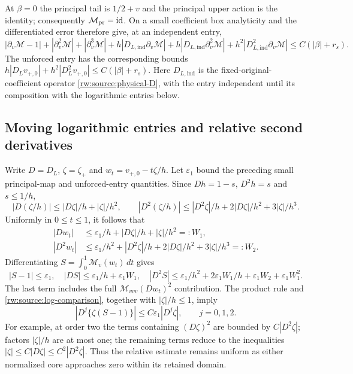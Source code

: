At $\beta=0$ the principal tail is $1/2+v$ and the principal upper
action is the identity; consequently $\mathcal M_{\rm pr}=\mathrm{id}$.
On a small coefficient box analyticity and the differentiated error
therefore give, at an independent entry,
\[
 |\partial_v\mathcal M-1|+|\partial_v^2\mathcal M|
 +|\partial_v^3\mathcal M|
 +h|D_{L,\mathrm{ind}}\partial_v\mathcal M|
 +h|D_{L,\mathrm{ind}}\partial_v^2\mathcal M|
 +h^2|D_{L,\mathrm{ind}}^2\partial_v\mathcal M|
 \le C(|\beta|+r_s).
\]
The unforced entry has the corresponding bounds
$h|D_Lv_{+,0}|+h^2|D_L^2v_{+,0}|\le C(|\beta|+r_s)$.
Here $D_{L,\mathrm{ind}}$ is the fixed-original-coefficient operator
\eqref{rw:source:physical-D}, with the entry independent until its
composition with the logarithmic entries below.

\subsection{Moving logarithmic entries and relative second derivatives}
\label{rw:app:source-moving-entry}

Write $D=D_L$, $\zeta=\zeta_+$ and
$w_t=v_{+,0}-t\zeta/h$. Let $\varepsilon_1$ bound the preceding
small principal-map and unforced-entry quantities. Since $Dh=1-s$,
$D^2h=s$ and $s\le1/h$,
\[
 |D(\zeta/h)|\le|D\zeta|/h+|\zeta|/h^2,
 \qquad
 |D^2(\zeta/h)|\le|D^2\zeta|/h
                     +2|D\zeta|/h^2+3|\zeta|/h^3.
\]
Uniformly in $0\le t\le1$, it follows that
\[
 \begin{aligned}
 |Dw_t|&\le\varepsilon_1/h+|D\zeta|/h+|\zeta|/h^2=:W_1,\\
 |D^2w_t|&\le\varepsilon_1/h^2+|D^2\zeta|/h
              +2|D\zeta|/h^2+3|\zeta|/h^3=:W_2.
 \end{aligned}
\]
Differentiating $S=\int_0^1\mathcal M_v(w_t)\,dt$ gives
\[
 |S-1|\le\varepsilon_1,\quad
 |DS|\le\varepsilon_1/h+\varepsilon_1W_1,
 \quad
 |D^2S|\le\varepsilon_1/h^2+2\varepsilon_1W_1/h
                      +\varepsilon_1W_2+\varepsilon_1W_1^2.
\]
The last term includes the full
$\mathcal M_{vvv}(Dw_t)^2$ contribution. The product rule and
\eqref{rw:source:log-comparison}, together with
$|\zeta|/h\le1$, imply
\[
 |D^j\{\zeta(S-1)\}|\le C\varepsilon_1|D^j\zeta|,
 \qquad j=0,1,2.
\]
For example, at order two the terms containing $(D\zeta)^2$
are bounded by $C|D^2\zeta|$; factors $|\zeta|/h$ are at
most one; the remaining terms reduce to the inequalities
$|\zeta|\le C|D\zeta|\le C^2|D^2\zeta|$.
Thus the relative estimate remains uniform as either normalized core
approaches zero within its retained domain.

